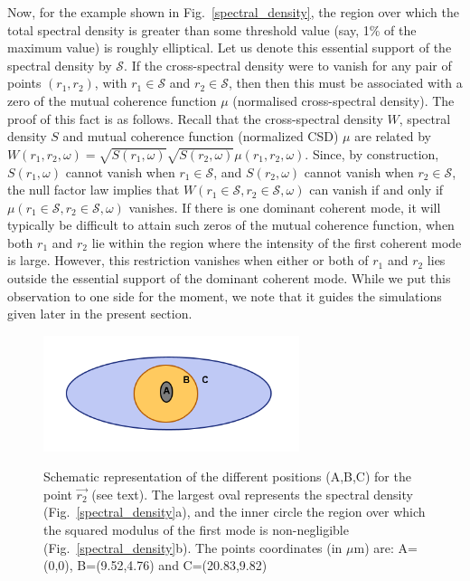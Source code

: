 \documentclass{iucr}              %
\newcommand{\inblue}[1]{{\color{blue}#1}}
\begin{document}
Now, for the example shown in \inblue{Fig.~\ref{spectral_density}}, the region over which the total spectral density is greater than some threshold value (say, 1\% of the maximum value) is roughly elliptical.  Let us denote this essential support of the spectral density by $\mathcal{S}$.  If the cross-spectral density were to vanish for any pair of points $(r_1,r_2)$, with $r_1 \in \mathcal{S}$ and $r_2 \in \mathcal{S}$, then then this must be associated with a zero of the mutual coherence function $\mu$ (normalised cross-spectral density).  The proof of this fact \cite{GburSPIE} is as follows.  Recall that the cross-spectral density $W$, spectral density $S$ and mutual coherence function (normalized CSD) $\mu$ are related by $W(r_1,r_2,\omega)=\sqrt{S(r_1,\omega)}\sqrt{S(r_2,\omega)}\mu(r_1,r_2,\omega)$.  Since, by construction, $S(r_1,\omega)$ cannot vanish when $r_1 \in \mathcal{S}$, and $S(r_2,\omega)$ cannot vanish when $r_2 \in \mathcal{S}$, the null factor law implies that $W(r_1\in \mathcal{S},r_2\in \mathcal{S},\omega)$ can vanish if and only if $\mu(r_1\in \mathcal{S},r_2\in \mathcal{S},\omega)$ vanishes.  If there is one dominant coherent mode, it will typically be difficult to attain such zeros of the mutual coherence function, when both $r_1$ and $r_2$ lie within the region where the intensity of the first coherent mode is large.  However, this restriction vanishes when either or both of $r_1$ and $r_2$ lies outside the essential support of the dominant coherent mode.  While we put this observation to one side for the moment, we note that it guides the simulations given later in the present section.        

\begin{figure}
\caption{Schematic representation of the different positions (A,B,C) for the point $\vec{r_2}$ (see text). The largest oval represents the spectral density (\inblue{Fig.~\ref{spectral_density}a}), and the inner circle the region over which the squared modulus of the first mode is non-negligible (Fig.~\ref{spectral_density}b).
The points coordinates (in $\mu$m) are: A=(0,0), B=(9.52,4.76) and C=(20.83,9.82)}
\includegraphics[width=7.5cm]{Figures/eye.png}
\label{eye}
\end{figure}
\end{document}
